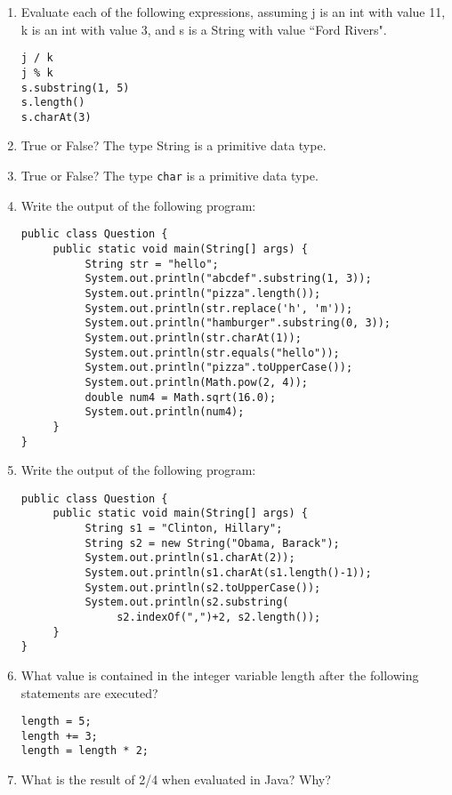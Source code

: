 \begin{enumerate}[label={\arabic{counter}\addtocounter{counter}{1}}.]
\item Evaluate each of the following expressions, assuming j is an int with value 11, k is an int with value 3, and s is a String with value ``Ford Rivers".
\begin{lstlisting}
j / k
j % k
s.substring(1, 5)
s.length()
s.charAt(3)
\end{lstlisting}

\item True or False? The type String is a primitive data type.

\item True or False? The type \verb|char| is a primitive data type.

\item Write the output of the following program:
\begin{lstlisting}
public class Question {
     public static void main(String[] args) {
          String str = "hello";
          System.out.println("abcdef".substring(1, 3));
          System.out.println("pizza".length());
          System.out.println(str.replace('h', 'm'));
          System.out.println("hamburger".substring(0, 3));
          System.out.println(str.charAt(1));
          System.out.println(str.equals("hello"));
          System.out.println("pizza".toUpperCase());
          System.out.println(Math.pow(2, 4));
          double num4 = Math.sqrt(16.0);
          System.out.println(num4);
     }
}
\end{lstlisting}

\item Write the output of the following program:
\begin{lstlisting}
public class Question {
     public static void main(String[] args) {
          String s1 = "Clinton, Hillary";
          String s2 = new String("Obama, Barack");
          System.out.println(s1.charAt(2));
          System.out.println(s1.charAt(s1.length()-1));
          System.out.println(s2.toUpperCase());
          System.out.println(s2.substring(
               s2.indexOf(",")+2, s2.length());
     }
}
\end{lstlisting}

\item What value is contained in the integer variable length after the following statements are executed?
\begin{lstlisting}
length = 5;
length += 3;
length = length * 2;
\end{lstlisting}

\item What is the result of 2/4 when evaluated in Java? Why?

\end{enumerate}


